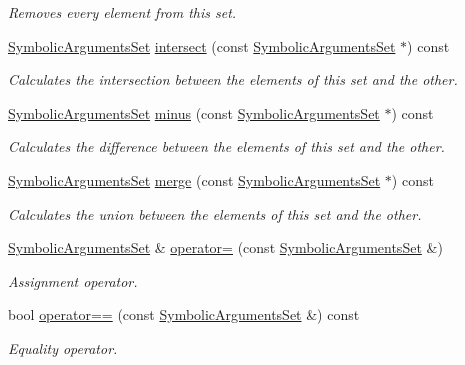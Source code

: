 \begin{DoxyCompactItemize}
\begin{DoxyCompactList}\small\item\em Removes every element from this set. \end{DoxyCompactList}\item 
\hyperlink{classSymbolicArgumentsSet}{Symbolic\-Arguments\-Set} \hyperlink{classSymbolicArgumentsSet_af56c54ab11f50f779bc9db1be185ae23}{intersect} (const \hyperlink{classSymbolicArgumentsSet}{Symbolic\-Arguments\-Set} $\ast$) const 
\begin{DoxyCompactList}\small\item\em Calculates the intersection between the elements of this set and the other. \end{DoxyCompactList}\item 
\hyperlink{classSymbolicArgumentsSet}{Symbolic\-Arguments\-Set} \hyperlink{classSymbolicArgumentsSet_a3c525d48917ac7fd7717b166cb15c9b7}{minus} (const \hyperlink{classSymbolicArgumentsSet}{Symbolic\-Arguments\-Set} $\ast$) const 
\begin{DoxyCompactList}\small\item\em Calculates the difference between the elements of this set and the other. \end{DoxyCompactList}\item 
\hyperlink{classSymbolicArgumentsSet}{Symbolic\-Arguments\-Set} \hyperlink{classSymbolicArgumentsSet_a4a20118a7831846281b7419e43b5446d}{merge} (const \hyperlink{classSymbolicArgumentsSet}{Symbolic\-Arguments\-Set} $\ast$) const 
\begin{DoxyCompactList}\small\item\em Calculates the union between the elements of this set and the other. \end{DoxyCompactList}\item 
\hyperlink{classSymbolicArgumentsSet}{Symbolic\-Arguments\-Set} \& \hyperlink{classSymbolicArgumentsSet_a5a666e499b5d78bd85f0ec64c6ba1d20}{operator=} (const \hyperlink{classSymbolicArgumentsSet}{Symbolic\-Arguments\-Set} \&)
\begin{DoxyCompactList}\small\item\em Assignment operator. \end{DoxyCompactList}\item 
bool \hyperlink{classSymbolicArgumentsSet_a093d415d52b21476c998a4a130a30fc7}{operator==} (const \hyperlink{classSymbolicArgumentsSet}{Symbolic\-Arguments\-Set} \&) const 
\begin{DoxyCompactList}\small\item\em Equality operator. \end{DoxyCompactList}\end{DoxyCompactItemize}


